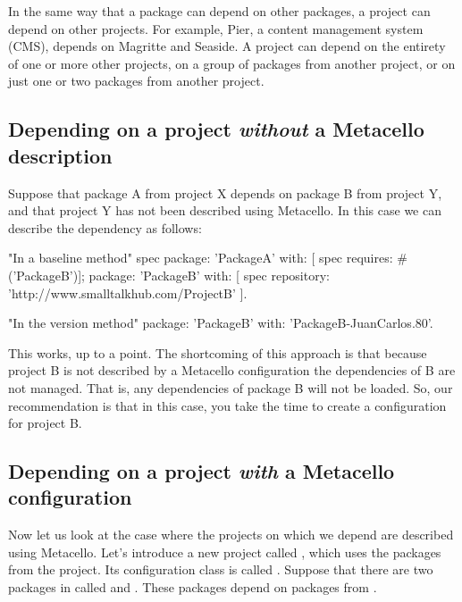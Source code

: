 \documentclass[a4paper,10pt,twoside]{book}
\begin{document}
In the same way that a package can depend on other packages, a project can depend on other projects.  For example, Pier, a content management system (CMS), depends on Magritte and Seaside.  A project can depend on the entirety of one or more other projects, on a group of packages from another project, or on just one or two packages from another project.

\subsection{Depending on a project \emph{without} a Metacello description}

Suppose that package A from project X depends on package B from project Y, and that project Y has not been described using Metacello. In this case we can describe the dependency as follows:

\begin{code}{}
      "In a baseline method"
      spec
             package: 'PackageA' with: [  spec requires: #('PackageB')];
             package: 'PackageB' with: [  spec
                   repository: 'http://www.smalltalkhub.com/ProjectB' ].
\end{code}

\begin{code}{}
      "In the version method"
      package: 'PackageB' with: 'PackageB-JuanCarlos.80'.
\end{code}

This works, up to a point.  The shortcoming of this approach is that because  project B is not described by a Metacello configuration the dependencies of B are not managed.
That is, any dependencies of package B will not be loaded. So, our recommendation is that in this case, you take the time to create a configuration for project B.

\subsection{Depending on a project \emph{with} a Metacello configuration}

Now let us look at the case where the projects on which we depend are described using Metacello.
Let's introduce a new project called , which uses the packages from the  project.  Its configuration class is called .   Suppose that there are two packages in  called  and . These packages depend on packages from .
\end{document}
